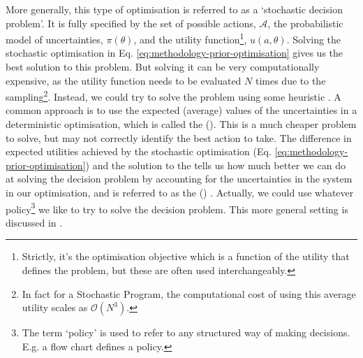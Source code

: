 More generally, this type of optimisation is referred to as a `stochastic decision problem'. It is fully specified by the set of possible actions, $\mathcal{A}$, the probabilistic model of uncertainties, $\pi(\theta)$, and the utility function\footnote{Strictly, it's the optimisation objective which is a function of the utility that defines the problem, but these are often used interchangeably.}, $u(a,\theta)$. Solving the stochastic optimisation in Eq. \ref{eq:methodology-prior-optimisation} gives us the best solution to this problem. But solving it can be very computationally expensive, as the utility function needs to be evaluated $N$ times due to the sampling\footnote{In fact for a Stochastic Program, the computational cost of using this average utility scales as $\mathcal{O}(N^3)$.}. Instead, we could try to solve the problem using some heuristic \citep{pickering2016ComparisonMetaheuristicLinear}. A common approach is to use the expected (average) values of the uncertainties in a deterministic optimisation, which is called the  (). This is a much cheaper problem to solve, but may not correctly identify the best action to take. The difference in expected utilities achieved by the stochastic optimisation (Eq. \ref{eq:methodology-prior-optimisation}) and the solution to the  tells us how much better we can do at solving the decision problem by accounting for the uncertainties in the system in our optimisation, and is referred to as the  () \citep{bistline2015ElectricSectorCapacity}. Actually, we could use whatever policy\footnote{The term `policy' is used to refer to any structured way of making decisions. E.g. a flow chart defines a policy.} we like to try to solve the decision problem. This more general setting is discussed in .

\newpage

